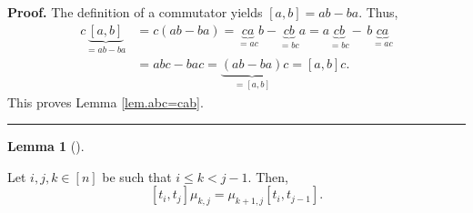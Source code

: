 \documentclass[numbers=enddot,12pt,final,onecolumn,notitlepage]{scrartcl}%
\theoremstyle{definition}
\newtheorem{lem}[theo]{Lemma}
\newenvironment{lemma}[1][]
{\begin{lem}[#1]\begin{leftbar}}
{\end{leftbar}\end{lem}}
\newenvironment{proof}[1][Proof]{\noindent\textbf{#1.} }{\ \rule{0.5em}{0.5em}}
\begin{document}
\begin{proof}
The definition of a commutator yields $\left[  a,b\right]  =ab-ba$. Thus,%
\begin{align*}
c\underbrace{\left[  a,b\right]  }_{=ab-ba}  & =c\left(  ab-ba\right)
=\underbrace{ca}_{=ac}b-\underbrace{cb}_{=bc}a=a\underbrace{cb}_{=bc}%
-\,b\underbrace{ca}_{=ac}\\
& =abc-bac=\underbrace{\left(  ab-ba\right)  }_{=\left[  a,b\right]
}c=\left[  a,b\right]  c.
\end{align*}
This proves Lemma \ref{lem.abc=cab}.
\end{proof}

\begin{lemma}
\label{lem.move-mu}Let $i,j,k\in\left[  n\right]  $ be such that $i\leq
k<j-1$. Then,%
\[
\left[  t_{i},t_{j}\right]  \mu_{k,j}=\mu_{k+1,j}\left[  t_{i},t_{j-1}\right]
.
\]

\end{lemma}
\end{document}
